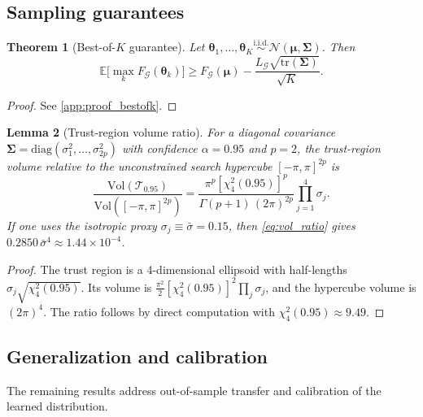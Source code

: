 \documentclass[aps,prx,reprint,superscriptaddress,longbibliography]{revtex4-2}
\newcommand{\Normal}{\mathcal{N}}
\newcommand{\calG}{\mathcal{G}}
\newcommand{\calT}{\mathcal{T}}
\newcommand{\bbE}{\mathbb{E}}
\newtheorem{theorem}{Theorem}
\newtheorem{lemma}[theorem]{Lemma}
\begin{document}
\subsection{Sampling guarantees}

\begin{theorem}[Best-of-$K$ guarantee]
\label{thm:bestofk}
Let $\bm\theta_1,\ldots,\bm\theta_K \stackrel{\text{i.i.d.}}{\sim}
\Normal(\bm\mu,\bm\Sigma)$. Then
\begin{equation}
    \bbE\bigl[\max_k F_\calG(\bm\theta_k)\bigr]
    \ge F_\calG(\bm\mu) - \frac{L_\calG\sqrt{\mathrm{tr}(\bm\Sigma)}}
    {\sqrt{K}}.
    \label{eq:bestofk}
\end{equation}
\end{theorem}

\begin{proof}
See \cref{app:proof_bestofk}.
\end{proof}

\begin{lemma}[Trust-region volume ratio]
\label{lem:dim_red}
For a diagonal covariance $\bm\Sigma = \mathrm{diag}(\sigma_1^2,
\ldots,\sigma_{2p}^2)$ with confidence $\alpha{=}0.95$ and $p{=}2$,
the trust-region volume relative to the unconstrained search
hypercube $[-\pi,\pi]^{2p}$ is
\begin{equation}
    \frac{\mathrm{Vol}(\calT_{0.95})}{\mathrm{Vol}([-\pi,\pi]^{2p})}
    = \frac{\pi^p [\chi^2_{4}(0.95)]^p}
    {\Gamma(p{+}1)\,(2\pi)^{2p}}
    \prod_{j=1}^{4}\sigma_j.
    \label{eq:vol_ratio}
\end{equation}
If one uses the isotropic proxy $\sigma_j \equiv \bar\sigma = 0.15$,
then \cref{eq:vol_ratio} gives
$0.2850\,\bar\sigma^4 \approx 1.44 \times 10^{-4}$.
\end{lemma}

\begin{proof}
The trust region is a 4-dimensional ellipsoid with half-lengths
$\sigma_j \sqrt{\chi^2_4(0.95)}$.
Its volume is $\frac{\pi^2}{2}[\chi^2_4(0.95)]^2
\prod_j \sigma_j$,
and the hypercube volume is $(2\pi)^4$.
The ratio follows by direct computation with $\chi^2_4(0.95)
\approx 9.49$.
\end{proof}

\subsection{Generalization and calibration}

The remaining results address out-of-sample transfer and calibration of
the learned distribution.
\end{document}
